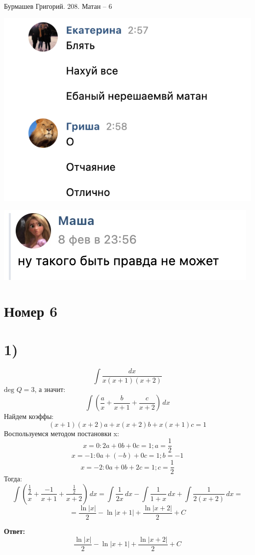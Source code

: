 \documentclass[a4paper,12pt]{article}
\author{Бурмашев Григорий, БПМИ-208}
\title{}
\date{\today}
\begin{document}
\begin{center}
Бурмашев Григорий. 208. Матан -- 6 
\end{center}
\begin{center}
\includegraphics[scale=1]{2.png}
\end{center}
\begin{center}
\includegraphics[scale=0.4]{1.jpg}
\end{center}
\clearpage
\section*{Номер 6}
\section*{1)}
\[
\int \frac{dx}{x(x+1)(x+2)}
\]
$\text{deg } Q = 3$, а значит:
\[
 \int \left( \frac{a}{x} + \frac{b}{x+1} + \frac{c}{x+2} \right) \, dx
\]
Найдем коэффы:
\[
(x+1)(x+2)a + x(x+2)b + x(x+1)c = 1
\]
Воспользуемся методом постановки x:
\[ 
x = 0 : 2a +0b + 0c = 1; a = \frac{1}{2}
\]
\[
x = -1: 0a + (-b) + 0c = 1; b = -1
\]
\[
x = -2: 0a + 0b + 2c =1 ; c = \frac{1}{2}
\]
Тогда:
\[
\int \left( \frac{\frac{1}{2}}{x} + \frac{-1}{x+1} + \frac{\frac{1}{2}}{x+2} \right) \, dx = \int \frac{1}{2x} \,dx - \int \frac{1}{1+x} \, dx + \int \frac{1}{2(x+2)} \, dx = 
\]
\[
= \frac{\ln|x|}{2} - \ln |x+1| + \frac{\ln |x+2|}{2} + C
\]
{\Large \begin{center}
\textbf{Ответ: } 
\[
\frac{\ln|x|}{2} - \ln |x+1| + \frac{\ln |x+2|}{2} + C
\]
\end{center}}
\end{document}
